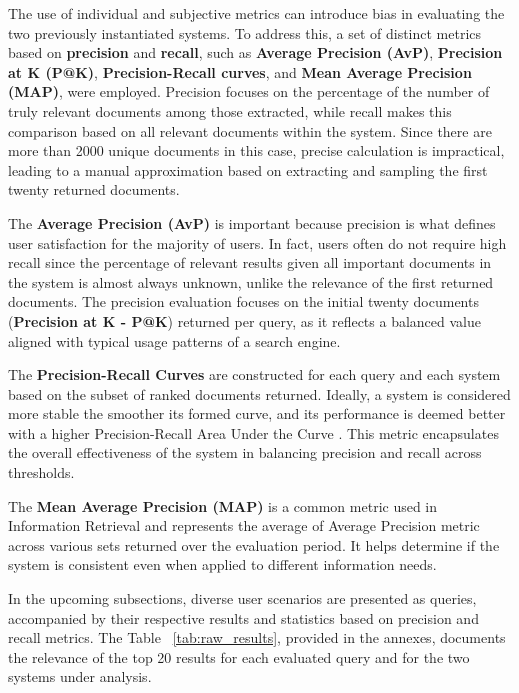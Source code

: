 \documentclass[sigconf]{acmart}
\begin{document}
The use of individual and subjective metrics can introduce bias in evaluating the two previously instantiated systems. To address this, a set of distinct metrics based on \textbf{precision} and \textbf{recall}, such as \textbf{Average Precision (AvP)}, \textbf{Precision at K (P@K)}, \textbf{Precision-Recall curves}, and \textbf{Mean Average Precision (MAP)}, were employed. Precision focuses on the percentage of the number of truly relevant documents among those extracted, while recall makes this comparison based on all relevant documents within the system. Since there are more than 2000 unique documents in this case, precise calculation is impractical, leading to a manual approximation based on extracting and sampling the first twenty returned documents.

The \textbf{Average Precision (AvP)} is important because precision is what defines user satisfaction for the majority of users. In fact, users often do not require high recall since the percentage of relevant results given all important documents in the system is almost always unknown, unlike the relevance of the first returned documents. The precision evaluation focuses on the initial twenty documents (\textbf{Precision at K - P@K}) returned per query, as it reflects a balanced value aligned with typical usage patterns of a search engine.

The \textbf{Precision-Recall Curves} are constructed for each query and each system based on the subset of ranked documents returned. Ideally, a system is considered more stable the smoother its formed curve, and its performance is deemed better with a higher Precision-Recall Area Under the Curve \cite{Precision_Recall}. This metric encapsulates the overall effectiveness of the system in balancing precision and recall across thresholds.

The \textbf{Mean Average Precision (MAP)} is a common metric used in Information Retrieval and represents the average of Average Precision metric across various sets returned over the evaluation period. It helps determine if the system is consistent even when applied to different information needs.

In the upcoming subsections, diverse user scenarios are presented as queries, accompanied by their respective results and statistics based on precision and recall metrics.
The Table ~\ref{tab:raw_results}, provided in the annexes, documents the relevance of the top 20 results for each evaluated query and for the two systems under analysis.
\end{document}
